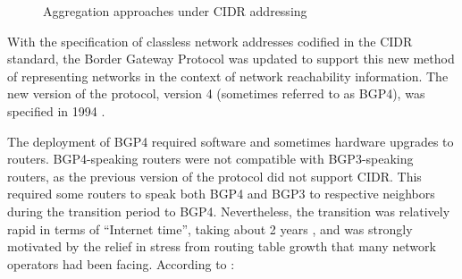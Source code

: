 \begin{figure}
\begin{centering}
\caption{Aggregation approaches under CIDR addressing}
\label{fig:cidr_agg}
\end{centering}
\end{figure}

With the specification of classless network addresses codified in the CIDR
standard, the Border Gateway Protocol was updated to support this new method of
representing networks in the context of network reachability information. The
new version of the protocol, version 4 (sometimes referred to as BGP4), was
specified in 1994 \cite{rfc1654}.

The deployment of BGP4 required software and sometimes hardware upgrades to
routers. BGP4-speaking routers were not compatible with BGP3-speaking routers,
as the previous version of the protocol did not support CIDR. This required
some routers to speak both BGP4 and BGP3 to respective neighbors during the
transition period to BGP4. Nevertheless, the transition was relatively rapid in
terms of ``Internet time'', taking about 2 years \cite{Li:2011vn}, and was
strongly motivated by the relief in stress from routing table growth that many
network operators had been facing. According to \cite{rfc1773}:

